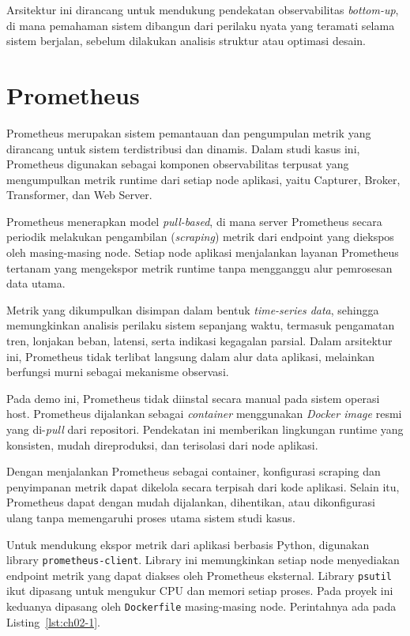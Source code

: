 Arsitektur ini dirancang untuk mendukung pendekatan observabilitas \emph{bottom-up}, di mana pemahaman sistem dibangun dari perilaku nyata yang teramati selama sistem berjalan, sebelum dilakukan analisis struktur atau optimasi desain.


\section{Prometheus}

Prometheus merupakan sistem pemantauan dan pengumpulan metrik yang dirancang untuk sistem terdistribusi dan dinamis. Dalam studi kasus ini, Prometheus digunakan sebagai komponen observabilitas terpusat yang mengumpulkan metrik runtime dari setiap node aplikasi, yaitu Capturer, Broker, Transformer, dan Web Server.

Prometheus menerapkan model \emph{pull-based}, di mana server Prometheus secara periodik melakukan pengambilan (\emph{scraping}) metrik dari endpoint yang diekspos oleh masing-masing node. Setiap node aplikasi menjalankan layanan Prometheus tertanam yang mengekspor metrik runtime tanpa mengganggu alur pemrosesan data utama.

Metrik yang dikumpulkan disimpan dalam bentuk \emph{time-series data}, sehingga memungkinkan analisis perilaku sistem sepanjang waktu, termasuk pengamatan tren, lonjakan beban, latensi, serta indikasi kegagalan parsial. Dalam arsitektur ini, Prometheus tidak terlibat langsung dalam alur data aplikasi, melainkan berfungsi murni sebagai mekanisme observasi.

Pada demo ini, Prometheus tidak diinstal secara manual pada sistem operasi host. Prometheus dijalankan sebagai \emph{container} menggunakan \emph{Docker image} resmi yang di-\emph{pull} dari repositori. Pendekatan ini memberikan lingkungan runtime yang konsisten, mudah direproduksi, dan terisolasi dari node aplikasi.

Dengan menjalankan Prometheus sebagai container, konfigurasi scraping dan penyimpanan metrik dapat dikelola secara terpisah dari kode aplikasi. Selain itu, Prometheus dapat dengan mudah dijalankan, dihentikan, atau dikonfigurasi ulang tanpa memengaruhi proses utama sistem studi kasus.

Untuk mendukung ekspor metrik dari aplikasi berbasis Python, digunakan library \texttt{prometheus-client}. Library ini memungkinkan setiap node menyediakan endpoint metrik yang dapat diakses oleh Prometheus eksternal. Library \texttt{psutil} ikut dipasang untuk mengukur CPU dan memori setiap proses. Pada proyek ini keduanya dipasang oleh \texttt{Dockerfile} masing-masing node. Perintahnya ada pada Listing~\ref{lst:ch02-1}.

